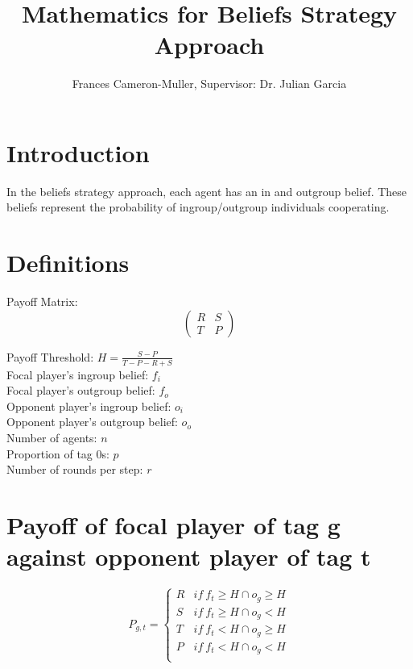 \documentclass[]{llncs}
\begin{document}
\title{Mathematics for Beliefs Strategy Approach}

\author{Frances Cameron-Muller, Supervisor: Dr. Julian Garcia}


\maketitle    

\section{Introduction}
In the beliefs strategy approach, each agent has an in and outgroup belief. These beliefs represent the probability of ingroup/outgroup individuals cooperating. 

\section{Definitions}
 
Payoff Matrix:
\begin{equation}
   \begin{pmatrix} 
   R & S  \\
   T & P  
   \end{pmatrix} 
\end{equation}

Payoff Threshold: $H = \frac{S-P}{T-P-R+S}$ \\
Focal player's ingroup belief:  $f_i$ \\  
Focal player's outgroup belief:  $f_o$ \\
Opponent player's ingroup belief:  $o_i$ \\ 
Opponent player's outgroup belief:  $o_o$ \\
Number of agents: $n$ \\ 
Proportion of tag 0s: $p$ \\ 
Number of rounds per step: $r$ \\ 

\section{Payoff of focal player of tag g against opponent player of tag t}

\[
   P_{g,t} =  \begin{cases}
        R & if\ f_t \geq H \cap o_g \geq H \\
        S & if\ f_t \geq H \cap o_g < H \\
        T & if\ f_t < H \cap o_g \geq H \\
        P & if\ f_t < H \cap o_g < H \\
    \end{cases}
\]
\end{document}
